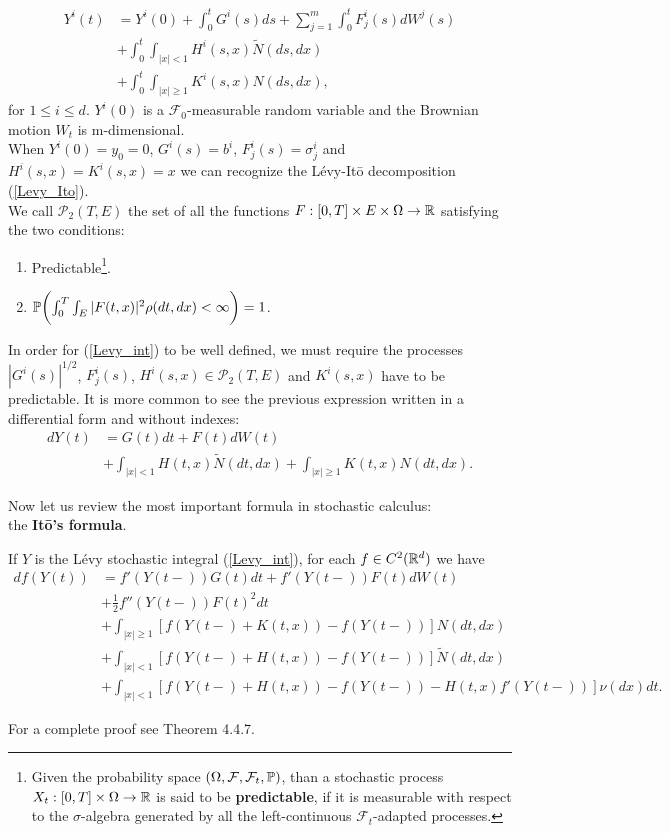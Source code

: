 \begin{align} \label{Levy_int}
 Y^i(t) &= Y^i(0) + \int_0^{t} G^i(s) ds  + \sum_{j=1}^m \int_0^{t} F^i_j(s) dW^j(s)\\ \nonumber
     &+ \int_0^{t} \int_{|x|<1} H^i(s,x) \tilde N (ds,dx)\\ \nonumber
     &+ \int_0^{t} \int_{|x|\geq 1} K^i(s,x) N(ds,dx),
\end{align}
for $1 \leq i \leq d$. $Y^i(0)$ is a $\mathcal{F}_0$-measurable random variable and the Brownian motion $W_t$ is m-dimensional.\\
When $Y^i(0)=y_0=0$, $G^i(s)=b^i$, $F^i_j(s)= \sigma^i_j$ and $H^i(s,x)=K^i(s,x) = x$ we can recognize the Lévy-It\={o} 
decomposition (\ref{Levy_Ito}).\\
We call $\mathcal{P}_2(T,E)$ the set of all the functions $F:[0,T]\times E \times \Omega \to \mathbb{R}$ satisfying the two conditions:
\begin{enumerate}
 \item Predictable\footnote{Given the probability space $(\Omega,\mathcal{F},\mathcal{F}_t,\mathbb{P})$, than a stochastic process
 $X_t : [0,T] \times \Omega \to \mathbb{R}$ is said to be \textbf{predictable}, if it is measurable with respect to the $\sigma$-algebra generated 
 by all the left-continuous $\mathcal{F}_t$-adapted processes.}.
 \item  $\mathbb{P} \biggl( \int_0^T \int_E |F(t,x)|^2 \rho(dt,dx) <\infty \biggr) =1 $.
\end{enumerate}
In order for (\ref{Levy_int}) to be well defined, we must require the processes $|G^i(s)|^{1/2}$, $F^i_j(s)$, $H^i(s,x) \in \mathcal{P}_2(T,E)$ and $K^i(s,x)$ have to be predictable.
It is more common to see the previous expression written in a differential form and without indexes:
\begin{align} \label{Levy_diff}
 dY(t) &= G(t) dt  + F(t) dW(t)\\ \nonumber
     &+ \int_{|x|<1} H(t,x) \tilde N (dt,dx) + \int_{|x|\geq 1} K(t,x) N(dt,dx).
\end{align}

Now let us review the most important formula in stochastic calculus: \\ the \textbf{It\={o}'s formula}.
\begin{Theorem}
 If $Y$ is the Lévy stochastic integral (\ref{Levy_int}), for each $f \in C^2(\mathbb{R}^d)$ we have  
\begin{align} \label{Ito_form}
 df(Y(t)) &= f'(Y(t-))G(t) dt  + f'(Y(t-))F(t) dW(t) \\ \nonumber
          &+ \frac{1}{2} f''(Y(t-))F(t)^2 dt \\ \nonumber 
          &+ \int_{|x|\geq 1} [f(Y(t-)+ K(t,x)) - f(Y(t-)) ] N(dt,dx) \\ \nonumber
          &+ \int_{|x|< 1} [f(Y(t-)+ H(t,x)) - f(Y(t-)) ] \tilde N(dt,dx) \\ \nonumber  
          &+ \int_{|x|< 1} [f(Y(t-)+ H(t,x)) - f(Y(t-)) - H(t,x)f'(Y(t-))] \nu(dx)dt. \nonumber
\end{align}
\end{Theorem}
For a complete proof see \cite{Applebaum} Theorem 4.4.7.
 
